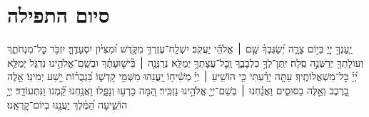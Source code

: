 \documentclass[twoside, openany, parskip=half, 11pt]{book}
\begin{document}
\negline
\kafdalet


\etzchaim




\nextpage

\section[סיום התפילה]{ סיום התפילה }
\label{ashrei}
\ashrei



יַֽעַנְךָ֣ יְיָ֭ בְּי֣וֹם צָרָ֑ה יְ֝שַׂגֶּבְךָ֗ שֵׁ֤ם ׀ אֱלֹהֵ֬י יַעֲקֹֽב׃
יִשְׁלַֽח־עֶזְרְךָ֥ מִקֹּ֑דֶשׁ וּ֝מִצִּיּ֗וֹן יִסְעָדֶֽךָּ׃
יִזְכֹּ֥ר כׇּל־מִנְחֹתֶ֑ךָ וְעוֹלָתְךָ֖ יְדַשְּׁנֶ֣ה סֶֽלָה׃
יִֽתֶּן־לְךָ֥ כִלְבָבֶ֑ךָ וְֽכׇל־עֲצָתְךָ֥ יְמַלֵּֽא׃
נְרַנְּנָ֤ה ׀ בִּ֘ישׁ֤וּעָתֶ֗ךָ וּבְשֵֽׁם־אֱלֹהֵ֥ינוּ נִדְגֹּ֑ל יְמַלֵּ֥א יְ֝יָ֗ כׇּל־מִשְׁאֲלוֹתֶֽיךָ׃
עַתָּ֤ה יָדַ֗עְתִּי כִּ֤י הוֹשִׁ֥יעַ ׀ יְיָ֗ מְשִׁ֫יח֥וֹ יַ֭עֲנֵהוּ מִשְּׁמֵ֣י קׇדְשׁ֑וֹ בִּ֝גְבֻר֗וֹת יֵ֣שַׁע יְמִינֽוֹ׃
אֵ֣לֶּה בָ֭רֶכֶב וְאֵ֣לֶּה בַסּוּסִ֑ים וַאֲנַ֓חְנוּ ׀ בְּשֵׁם־יְיָ֖ אֱלֹהֵ֣ינוּ נַזְכִּֽיר׃
הֵ֭מָּה כָּרְע֣וּ וְנָפָ֑לוּ וַאֲנַ֥חְנוּ קַּ֝֗מְנוּ וַנִּתְעוֹדָֽד׃
יְיָ֥ הוֹשִׁ֑יעָה הַ֝מֶּ֗לֶךְ יַעֲנֵ֥נוּ בְיוֹם־קׇרְאֵֽנוּ׃
\end{document}
